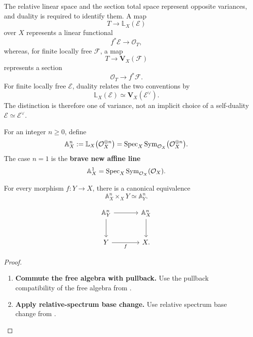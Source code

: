 \begin{remark}
\label{rem:linear-coordinate-section-conventions}
The relative linear space and the section total space represent opposite
variances, and duality is required to identify them. A map
\[
    T\longrightarrow\mathbb L_X(\mathcal E)
\]
over \(X\) represents a linear functional
\[
    f^*\mathcal E\longrightarrow\mathcal O_T,
\]
whereas, for finite locally free \(\mathcal F\), a map
\[
    T\longrightarrow\mathbf V_X(\mathcal F)
\]
represents a section
\[
    \mathcal O_T\longrightarrow f^*\mathcal F.
\]
For finite locally free \(\mathcal E\), duality relates the two conventions
by
\[
    \mathbb L_X(\mathcal E)
    \simeq
    \mathbf V_X(\mathcal E^\vee).
\]
The distinction is therefore one of variance, not an implicit choice of a
self-duality \(\mathcal E\simeq\mathcal E^\vee\).
\end{remark}

\begin{definition}
\label{def:brave-new-affine-space}
For an integer $n\geq0$, define
\[
    \mathbb A_X^n
    :=
    \mathbb L_X
    \bigl(
        \mathcal O_X^{\oplus n}
    \bigr)
    =
    \operatorname{Spec}_X
    \operatorname{Sym}_{\mathcal O_X}
    \bigl(
        \mathcal O_X^{\oplus n}
    \bigr).
\]
The case $n=1$ is the \textbf{brave new affine line}
\[
    \mathbb A_X^1
    =
    \operatorname{Spec}_X
    \operatorname{Sym}_{\mathcal O_X}(\mathcal O_X).
\]
\end{definition}

\begin{proposition}
\label{prop:affine-space-base-change}
For every morphism $f:Y\to X$, there is a canonical equivalence
\[
    \mathbb A_X^n
    \times_X
    Y
    \simeq
    \mathbb A_Y^n.
\]
\end{proposition}

\[
\begin{tikzcd}[column sep=large, row sep=large]
    \mathbb A_Y^n
        \arrow[r]
        \arrow[d]
    &
    \mathbb A_X^n
        \arrow[d]
    \\
    Y
        \arrow[r, "f"']
    &
    X.
\end{tikzcd}
\]


\begin{proof}
\leavevmode
\begin{enumerate}[label=\textup{(\arabic*)}]
    \item \textbf{Commute the free algebra with pullback.}
    Use the pullback compatibility of the free algebra from
    .

    \item \textbf{Apply relative-spectrum base change.}
    Use relative spectrum base
    change from .
\end{enumerate}
\end{proof}

